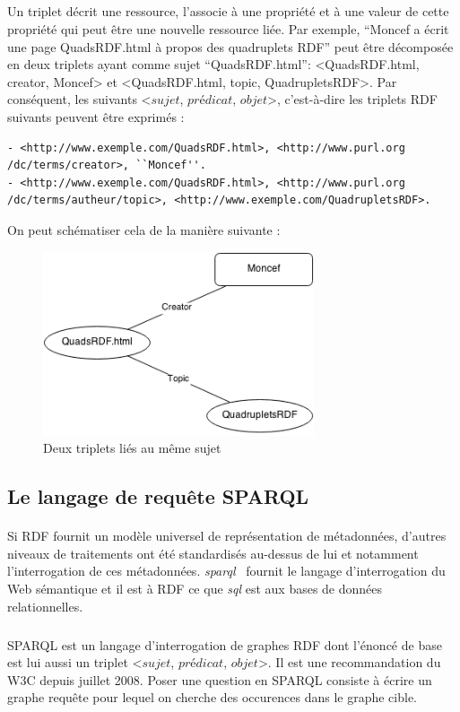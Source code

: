 \subparagraph{}
Un triplet décrit une ressource, l’associe à une propriété et à une valeur de cette propriété qui peut être une nouvelle ressource liée. 
\newline
Par exemple, ``Moncef a écrit une page QuadsRDF.html à propos des quadruplets RDF” peut être décomposée en deux triplets ayant comme sujet ``QuadsRDF.html”: <QuadsRDF.html, creator, Moncef> et <QuadsRDF.html, topic, QuadrupletsRDF>.
\newline
Par conséquent, les suivants <$sujet$, $prédicat$, $objet$>, c'est-à-dire les triplets RDF suivants peuvent être exprimés :
\begin{verbatim}
- <http://www.exemple.com/QuadsRDF.html>, <http://www.purl.org
/dc/terms/creator>, ``Moncef''.
- <http://www.exemple.com/QuadsRDF.html>, <http://www.purl.org
/dc/terms/autheur/topic>, <http://www.exemple.com/QuadrupletsRDF>.
\end{verbatim}
On peut schématiser cela de la manière suivante :
\begin{figure}[H]
\centering
\centering
\includegraphics[width=8cm]{Diagram.png}
\caption{Deux triplets liés au même sujet}
\end{figure}
\subsection{Le langage de requête SPARQL}
\paragraph{}
Si RDF fournit un modèle universel de représentation de métadonnées, d'autres niveaux de traitements ont été standardisés au-dessus de lui et notamment l'interrogation de ces métadonnées. 
{\itshape \gls{sparql}}~\cite{SPARQL_W3C:13} fournit le langage d'interrogation du Web sémantique et il est à RDF ce que {\itshape \gls{sql}} est aux bases de données relationnelles.
\subparagraph{}
SPARQL est un langage d'interrogation de graphes RDF dont l'énoncé de base est lui aussi un triplet <$sujet$, $prédicat$, $objet$>. Il est une recommandation du W3C depuis juillet 2008.
Poser une question en SPARQL consiste à écrire un graphe requête pour lequel on cherche des occurences dans le graphe cible.

